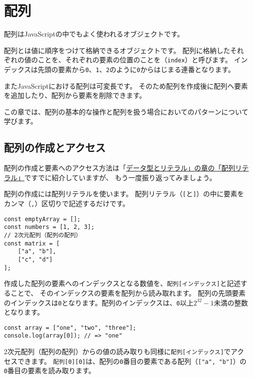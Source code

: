\hypertarget{array}{%
\chapter{配列}\label{array}}
\thispagestyle{frontheadings}

配列はJavaScriptの中でもよく使われるオブジェクトです。

配列とは値に順序をつけて格納できるオブジェクトです。
配列に格納したそれぞれの値のことを\textbf{}、それぞれの要素の位置のことを\textbf{}（\texttt{index}）と呼びます。
インデックスは先頭の要素から\texttt{0}、\texttt{1}、\texttt{2}のように\texttt{0}からはじまる連番となります。

またJavaScriptにおける配列は可変長です。
そのため配列を作成後に配列へ要素を追加したり、配列から要素を削除できます。

この章では、配列の基本的な操作と配列を扱う場合においてのパターンについて学びます。

\hypertarget{create-and-access}{%
\section{配列の作成とアクセス}\label{create-and-access}}

配列の作成と要素へのアクセス方法は「\hyperlink{array-literal}{データ型とリテラル」の章の「配列リテラル」}ですでに紹介していますが、
もう一度振り返ってみましょう。

配列の作成には配列リテラルを使います。
配列リテラル（\texttt{[}と\texttt{]}）の中に要素をカンマ（\texttt{,}）区切りで記述するだけです。

\begin{lstlisting}
const emptyArray = [];
const numbers = [1, 2, 3];
// 2次元配列（配列の配列）
const matrix = [
    ["a", "b"],
    ["c", "d"]
];
\end{lstlisting}

作成した配列の要素へのインデックスとなる数値を、\texttt{配列[インデックス]}と記述することで、
そのインデックスの要素を配列から読み取れます。
配列の先頭要素のインデックスは\texttt{0}となります。配列のインデックスは、\texttt{0}以上\texttt{$2^{32} - 1$}未満の整数となります。

\begin{lstlisting}
const array = ["one", "two", "three"];
console.log(array[0]); // => "one"
\end{lstlisting}

2次元配列（配列の配列）からの値の読み取りも同様に\texttt{配列[インデックス]}でアクセスできます。
\texttt{配列[0][0]}は、配列の\texttt{0}番目の要素である配列（\texttt{["a", "b"]}）の\texttt{0}番目の要素を読み取ります。

